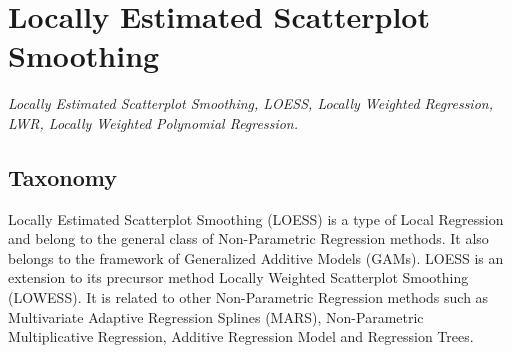 
\section{Locally Estimated Scatterplot Smoothing} 
\label{sec:loess}

\emph{Locally Estimated Scatterplot Smoothing, LOESS, Locally Weighted Regression, LWR, Locally Weighted Polynomial Regression.}

\subsection{Taxonomy}
Locally Estimated Scatterplot Smoothing (LOESS) is a type of Local Regression and belong to the general class of Non-Parametric Regression methods. It also belongs to the framework of Generalized Additive Models (GAMs).
LOESS is an extension to its precursor method Locally Weighted Scatterplot Smoothing (LOWESS).
It is related to other Non-Parametric Regression methods such as Multivariate Adaptive Regression Splines (MARS), Non-Parametric Multiplicative Regression, Additive Regression Model and Regression Trees. 

